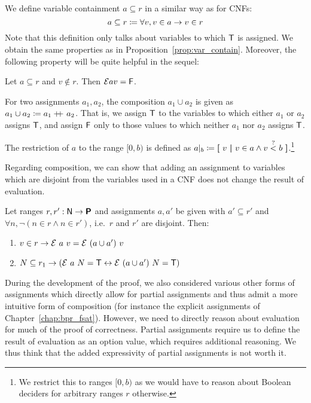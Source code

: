 We define variable containment $a \subseteq r$ in a similar way as for CNFs:
\[a \subseteq r \coloneqq \forall v, v \in a \rightarrow v \in r \]
Note that this definition only talks about variables to which $\mathsf{T}$ is assigned.
We obtain the same properties as in Proposition~\ref{prop:var_contain}.
Moreover, the following property will be quite helpful in the sequel:
\begin{proposition}
  Let $a \subseteq r$ and $v \notin r$. Then $\mathcal{E}{a}{v} = \mathsf{F}$.
\end{proposition}

\begin{definition}
  For two assignments $a_1, a_2$, the composition $a_1 \cup a_2$ is given as $a_1 \cup a_2 \coloneqq a_1 +\kern-1.3ex+\kern0.8ex a_2$. 
  That is, we assign $\mathsf{T}$ to the variables to which either $a_1$ or $a_2$ assigns $\mathsf{T}$, and assign $\mathsf{F}$ only to those values to which neither $a_1$ nor $a_2$ assigns $\mathsf{T}$.

  The restriction of $a$ to the range $[0, b)$ is defined as $a|_b \coloneqq \textbf{[}~ v ~\textbf{|}~ v \in a \land v \overset{?}{<} b ~\textbf{]}$.\footnote{We restrict this to ranges $[0, b)$ as we would have to reason about Boolean deciders for arbitrary ranges $r$ otherwise.} 
\end{definition}

Regarding composition, we can show that adding an assignment to variables which are disjoint from the variables used in a CNF does not change the result of evaluation. 
\begin{proposition}
  Let ranges $r, r' : \mathsf{N} \rightarrow \textsf{\bfseries P}$ and assignments $a, a'$ be given with $a' \subseteq r'$ and $\forall n, \lnot (n \in r \land n \in r')$, i.e.\ $r$ and $r'$ are disjoint. Then:
  \begin{enumerate}
    \item $v \in r \rightarrow \mathcal{E}~a~v = \mathcal{E}~(a \cup a')~v$
    \item $N \subseteq r_1 \rightarrow (\mathcal{E}~a~N = \mathsf{T} \leftrightarrow \mathcal{E}~(a \cup a')~N = \mathsf{T})$
  \end{enumerate}
\end{proposition}


\begin{remark}
  During the development of the proof, we also considered various other forms of assignments which directly allow for partial assignments and thus admit a more intuitive form of composition (for instance the explicit assignments of Chapter~\ref{chap:bpr_fsat}). 
  However, we need to directly reason about evaluation for much of the proof of correctness. Partial assignments require us to define the result of evaluation as an option value, which requires additional reasoning. 
  We thus think that the added expressivity of partial assignments is not worth it.
\end{remark}

